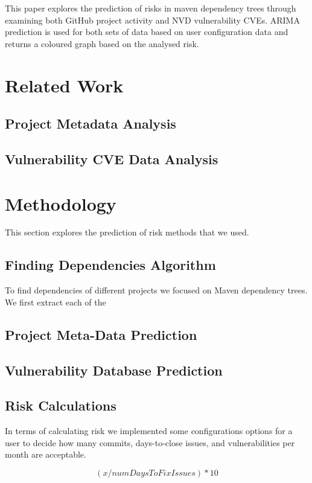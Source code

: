 \documentclass[10pt, onecolumn]{IEEEtran}
\begin{document}
This paper explores the prediction of risks in maven dependency trees through examining both GitHub project activity and NVD vulnerability CVEs. ARIMA prediction is used for both sets of data based on user configuration data and returns a coloured graph based on the analysed risk. 

\section{Related Work}

\subsection{Project Metadata Analysis}


\subsection{Vulnerability CVE Data Analysis}

\section{Methodology}
This section explores the prediction of risk methods that we used.

\subsection{Finding Dependencies Algorithm}
To find dependencies of different projects we focused on Maven dependency trees. We first extract each of the 

\subsection{Project Meta-Data Prediction}

\subsection{Vulnerability Database Prediction}

\subsection{Risk Calculations}
In terms of calculating risk we implemented some configurations options for a user to decide how many commits, days-to-close issues, and vulnerabilities per month are acceptable. 


\[( x / numDaysToFixIssues ) * 10\]
\end{document}
